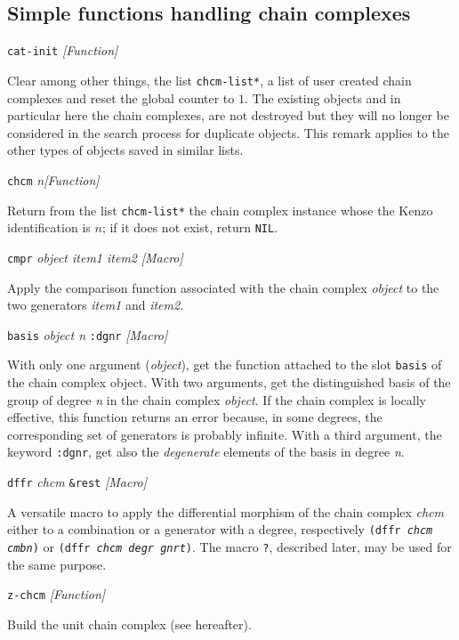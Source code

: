 \subsection {Simple functions handling chain complexes}

{\parindent=0mm
{\leftskip=5mm
{\tt cat-init} \hfill {\em [Function]} \par}
{\leftskip=15mm
Clear among other things, the list {\tt *chcm-list*}, a list of user created chain complexes  and reset
the global counter to $1$. The existing objects and in particular here the chain complexes,
are not destroyed but they will no longer be considered in the search process for duplicate
objects. This remark applies to the other types of objects saved in similar lists.   \par}
{\leftskip=5mm
{\tt chcm} {\em n}\hfill {\em [Function]} \par}
{\leftskip=15mm
Return from the list {\tt *chcm-list*} the chain complex instance whose the Kenzo identification is $n$;
if it does not exist, return {\tt NIL}. \par}
{\leftskip=5mm
{\tt cmpr} {\em object item1 item2} \hfill {\em [Macro]} \par}
{\leftskip=15mm
Apply the comparison function associated with the chain complex {\em object} to the two generators
{\em item1} and {\em item2}.  \par}
{\leftskip=5mm
{\tt basis} {\em object n} {\tt :dgnr} \hfill {\em [Macro]} \par}
{\leftskip=15mm
With only one argument ({\em object}), get the  function attached to the slot {\tt basis} of the chain complex object.
With two arguments,
get the distinguished basis of the group of degree {\em n} in the chain complex {\em object}.
If the chain complex is locally effective,
this function returns an error because, in some degrees, the corresponding set of generators is
probably infinite. With a third argument, the keyword {\tt :dgnr},  get also the {\em degenerate}
elements of the basis in degree {\em n}.\par}
{\leftskip=5mm
{\tt dffr} {\em chcm} {\tt \&rest} \hfill {\em [Macro]} \par}
{\leftskip=15mm
A versatile macro to apply the differential morphism of the chain complex {\em chcm} either to a combination or
a generator with a degree, respectively {\tt (dffr {\em chcm cmbn})} or
{\tt (dffr {\em chcm degr gnrt})}. The macro {\tt ?}, described later, may be used for the same purpose. \par}
{\leftskip=5mm
{\tt z-chcm} \hfill {\em [Function]} \par}
{\leftskip=15mm
Build the unit chain complex (see hereafter). \par}
}
